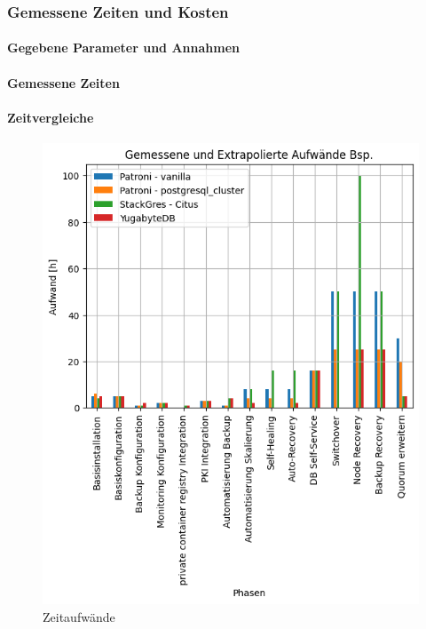 
\begin{flushleft}
    \subsubsection{Gemessene Zeiten und Kosten}
    \paragraph{Gegebene Parameter und Annahmen}
    \paragraph{Gemessene Zeiten}
    \paragraph{Zeitvergleiche}

    \begin{figure}[H]
        \centering
        \includegraphics[width=1\linewidth]{source/pandas_data_chart_plotter/time_investment}
        \caption{Zeitaufwände}
        \label{fig:time_investment}
    \end{figure}

\end{flushleft}
